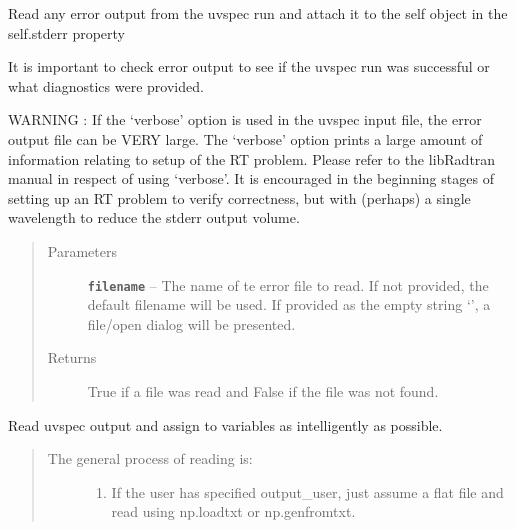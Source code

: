 \documentclass[a4paper,10pt,english]{sphinxmanual}
\begin{document}
\begin{fulllineitems}

\begin{fulllineitems}
\label{packages:librad.Case.readerr}
Read any error output from the uvspec run and attach it to the self object in the self.stderr property

It is important to check error output to see if the uvspec run was successful or what diagnostics were
provided.

WARNING : If the `verbose' option is used in the uvspec input file, the error output file can be VERY large.
The `verbose' option prints a large amount of information relating to setup of the RT problem. Please refer to
the libRadtran manual in respect of using `verbose'. It is encouraged in the beginning stages of setting up
an RT problem to verify correctness, but with (perhaps) a single wavelength to reduce the stderr output
volume.
\begin{quote}\begin{description}
\item[{Parameters}] \leavevmode
\textbf{\texttt{filename}} -- The name of te error file to read. If not provided, the default filename will be used. If
provided as the empty string `', a file/open dialog will be presented.

\item[{Returns}] \leavevmode
True if a file was read and False if the file was not found.

\end{description}\end{quote}

\end{fulllineitems}


\begin{fulllineitems}
\label{packages:librad.Case.readout}
Read uvspec output and assign to variables as intelligently as possible.
\begin{quote}
\begin{description}
\item[{The general process of reading is:}] \leavevmode\begin{enumerate}
\item {} 
If the user has specified output\_user, just assume a flat file and read using
np.loadtxt or np.genfromtxt.


\end{enumerate}
\end{description}
\end{quote}
\end{fulllineitems}
\end{fulllineitems}
\end{document}
